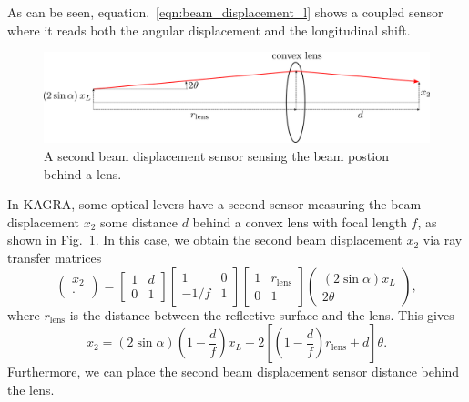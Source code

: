 As can be seen, equation.~\eqref{eqn:beam_displacement_l} shows a coupled sensor where it reads both the angular displacement and the longitudinal shift.

\begin{figure}[!h]
	\centering
	\includegraphics[width=134mm]{figures/optical_lever_lens}
	\caption{A second beam displacement sensor sensing the beam postion behind a lens.}
	\label{fig:opticalleverlens}
\end{figure}
In KAGRA, some optical levers have a second sensor measuring the beam displacement $x_2$ some distance $d$ behind a convex lens with focal length $f$, as shown in Fig.~\ref{fig:opticalleverlens}.
In this case, we obtain the second beam displacement $x_2$ via ray transfer matrices \cite{enwiki:1018856234}
\begin{equation}
	\begin{pmatrix}
		x_2\\
		\cdot
	\end{pmatrix}
	=
	\begin{bmatrix}
		1 & d\\
		0 & 1
	\end{bmatrix}
	\begin{bmatrix}
		1 & 0\\
		-1/f & 1
	\end{bmatrix}
	\begin{bmatrix}
		1 & r_\mathrm{lens} \\
		0 & 1
	\end{bmatrix}
	\begin{pmatrix}
		\left(2\sin{\alpha} \right)x_L\\
		2\theta
	\end{pmatrix},
\end{equation}
where $r_\mathrm{lens}$ is the distance between the reflective surface and the lens.
This gives
\begin{equation}
	x_2 = \left(2\sin\alpha\right)\left(1-\frac{d}{f}\right)x_L + 2\left[\left(1-\frac{d}{f}\right)r_\mathrm{lens}+d\right]\theta. 
	\label{eqn:beam_displacement_lens_1}
\end{equation}
Furthermore, we can place the second beam displacement sensor distance behind the lens.
